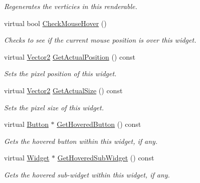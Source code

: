 \begin{DoxyCompactItemize}
\begin{DoxyCompactList}\small\item\em Regenerates the verticies in this renderable. \item\end{DoxyCompactList}\item 
virtual bool \hyperlink{classMezzanine_1_1UI_1_1Widget_a66f1b21671530de8f7696185c7080d7b}{CheckMouseHover} ()
\begin{DoxyCompactList}\small\item\em Checks to see if the current mouse position is over this widget. \item\end{DoxyCompactList}\item 
virtual \hyperlink{classMezzanine_1_1Vector2}{Vector2} \hyperlink{classMezzanine_1_1UI_1_1Widget_afa615f27b3b95d4f847f5d779371209a}{GetActualPosition} () const 
\begin{DoxyCompactList}\small\item\em Sets the pixel position of this widget. \item\end{DoxyCompactList}\item 
virtual \hyperlink{classMezzanine_1_1Vector2}{Vector2} \hyperlink{classMezzanine_1_1UI_1_1Widget_acd8f1a20e80c7f4218c38fe961215469}{GetActualSize} () const 
\begin{DoxyCompactList}\small\item\em Sets the pixel size of this widget. \item\end{DoxyCompactList}\item 
virtual \hyperlink{classMezzanine_1_1UI_1_1Button}{Button} $\ast$ \hyperlink{classMezzanine_1_1UI_1_1Widget_ad9ab22e33338ddb8e13bf663de0092f1}{GetHoveredButton} () const 
\begin{DoxyCompactList}\small\item\em Gets the hovered button within this widget, if any. \item\end{DoxyCompactList}\item 
virtual \hyperlink{classMezzanine_1_1UI_1_1Widget}{Widget} $\ast$ \hyperlink{classMezzanine_1_1UI_1_1Widget_a99615938f31dd6b5c6d8fa9d9dc96d3d}{GetHoveredSubWidget} () const 
\begin{DoxyCompactList}\small\item\em Gets the hovered sub-\/widget within this widget, if any. \item\end{DoxyCompactList}\item 

\end{DoxyCompactItemize}

